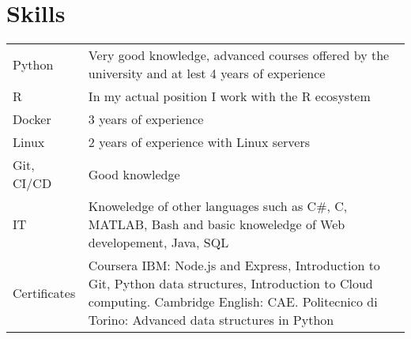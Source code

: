 \documentclass[a4paper,12pt]{article}
\begin{document}



\section{Skills}
\begin{tabularx}{\linewidth}{@{}l X@{}}
Python  &  \normalsize{Very good knowledge, advanced courses offered by the university and at lest 4 years of experience}\\ 
R &  \normalsize{In my actual position I work with the R ecosystem}\\
Docker  &  \normalsize{3 years of experience}\\  
Linux  &  \normalsize{2 years of experience with Linux servers}\\  
Git, CI/CD &  \normalsize{Good knowledge}\\
IT & \normalsize{Knoweledge of other languages such as C\#, C, MATLAB, Bash and basic knoweledge of Web developement, Java, SQL} \\
Certificates  &  \normalsize{Coursera IBM: Node.js and Express, Introduction to Git, Python data structures, Introduction to Cloud computing. Cambridge English: CAE. Politecnico di Torino: Advanced data structures in Python}\\  

\end{tabularx}
\end{document}
